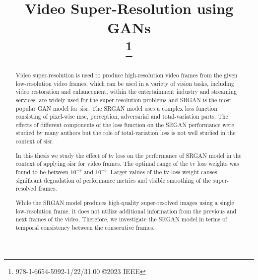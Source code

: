 \documentclass[conference]{IEEEtran}
\begin{document}
\title{Video Super-Resolution using GANs\\
\thanks{978-1-6654-5992-1/22/31.00 ©2023 IEEE}
}

\author{
}

\graphicspath{{./img/}}

\maketitle


\begin{abstract}
    Video super-resolution is used to produce high-resolution video frames from the given low-resolution video frames, which can be used in a variety of vision tasks, including video restoration and enhancement, within the entertainment industry and streaming services.  are widely used for the super-resolution problems and SRGAN \cite{srgan_2016} is the most popular GAN model for \acrfull{sisr}. The SRGAN model uses a complex loss function consisting of pixel-wise \acrfull{mse}, perception, adversarial and total-variation parts. The effects of different components of the loss function on the SRGAN performance were studied by many authors \cite{esrgan_2018,srgan_2016,weighted_srgan_2021} but the role of total-variation loss is not well studied in the context of \acrshort{sisr}.

    In this thesis we study the effect of \acrfull{tv} loss on the performance of SRGAN model in the context of applying \acrlong{sisr} for video frames. The optimal range of the \acrshort{tv} loss weights was found to be between $10^{-8}$ and $10^{-6}$. Larger values of the \acrshort{tv} loss weight causes significant degradation of performance metrics and visible smoothing of the super-resolved frames.
    
    While the SRGAN model produces high-quality super-resolved images using a single low-resolution frame, it does not utilize additional information from the previous and next frames of the video. Therefore, we investigate the SRGAN model in terms of temporal consistency between the consecutive frames.

\end{abstract}
\end{document}
